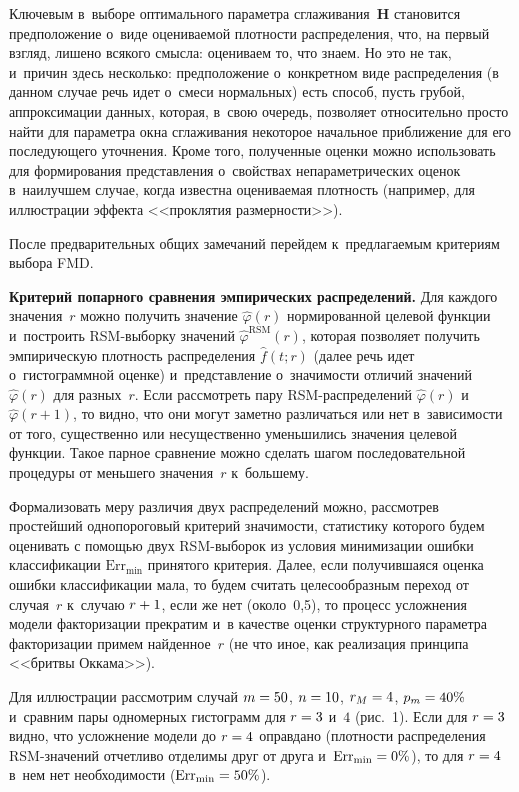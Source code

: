 \begin{multicols}{2}
     Ключевым в~выборе оптимального параметра сглаживания~$\mathbf{H}$ 
становится предположение о~виде оцениваемой плотности распределения, что, 
на первый взгляд, лишено всякого смысла: оцениваем то, что знаем. Но это не 
так, и~причин здесь несколько: предположение о~конкретном виде 
распределения (в данном случае речь идет о~смеси нормальных) есть способ, 
пусть грубой, аппроксимации данных, которая, в~свою очередь, позволяет 
относительно просто найти для параметра окна сглаживания некоторое 
начальное приближение для его последующего уточнения. Кроме того, 
полученные оценки можно использовать для формирования представления 
о~свойствах непараметрических оценок в~наилучшем случае, когда известна 
оцениваемая плот\-ность (например, для иллюстрации эффекта <<проклятия 
размерности>>).
     
     После предварительных общих замечаний перейдем к~предлагаемым 
критериям выбора FMD.
     
     \textbf{Критерий попарного сравнения эмпирических 
распределений.} Для каждого значения~$r$ можно получить значение 
$\hat{\varphi}(r)$ нормированной целевой функции и~построить 
RSM-вы\-бор\-ку значений $\hat{\varphi}^{\mathrm{RSM}}(r)$, которая позволяет получить 
эмпирическую плотность распределения $\hat{f}(t;r)$ (далее речь идет 
о~гистограммной оценке) и~представление о~значимости отличий 
значений $\hat{\varphi}(r)$ для разных~$r$. Если рас\-смот\-реть пару  
RSM-рас\-пре\-де\-ле\-ний $\hat{\varphi}(r)$  и~$\hat{\varphi}(r+1)$, то видно, 
что они могут заметно различаться или нет в~зависимости от того, существенно 
или несущественно уменьшились значения целевой функции. Такое парное 
сравнение можно сделать шагом последовательной процедуры от меньшего 
значения~$r$ к~большему.
     
     Формализовать меру различия двух распределений можно, рассмотрев 
простейший однопороговый критерий значимости, статистику которого будем 
оценивать с помощью двух RSM-выборок из условия минимизации ошибки 
классификации $\mathrm{Err}_{\min}$ принятого критерия. Далее, если получившаяся 
оценка ошибки классификации мала, то будем считать целесообразным переход 
от случая~$r$ к~случаю $r\hm+1$, если же нет (около~0,5), то процесс 
усложнения модели факторизации прекратим и~в качестве оценки структурного 
параметра факторизации примем найденное~$r$ (не что иное, как реализация 
принципа <<брит\-вы Ок\-ка\-ма>>). 

Для иллюстрации рассмотрим случай 
$m\hm=50$, $n\hm=10$, $r_M\hm=4$, $p_m\hm=40\%$ и~сравним пары 
одномерных гистограмм для $r\hm=3$ и~$4$ (рис.~1). Если для $r\hm=3$ 
видно, что усложнение модели до $r\hm=4$ оправдано (плотности 
распределения RSM-зна\-че\-ний отчетливо отделимы друг от друга 
и~$\mathrm{Err}_{\min}\hm= 0\%$), то для $r\hm=4$ в~нем нет необходимости 
($\mathrm{Err}_{\min} \hm= 50\%$).
     





\end{multicols}
